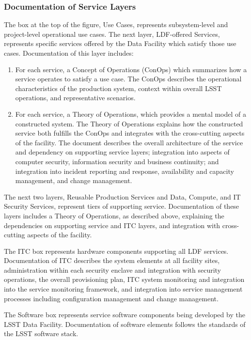 \subsubsection{Documentation of Service Layers}

The box at the top of the figure, Use Cases, represents subsystem-level and project-level operational use cases. The next layer, LDF-offered Services, represents specific services offered by the Data Facility which satisfy those use cases. Documentation of this layer includes:

\begin{enumerate}
\item	For each service, a Concept of Operations (ConOps) which summarizes how a service operates to satisfy a use case. The ConOps describes the operational characteristics of the production system, context within overall LSST operations, and representative scenarios. 
\item	For each service, a Theory of Operations, which provides a mental model of a constructed system. The Theory of Operations explains how the constructed service both fulfills the ConOps and integrates with the cross-cutting aspects of the facility. The document describes the overall architecture of the service and dependency on supporting service layers; integration into aspects of computer security, information security and business continuity; and integration into incident reporting and response, availability and capacity management, and change management.
\end{enumerate}

The next two layers, Reusable Production Services and Data, Compute, and IT Security Services, represent tiers of supporting service. Documentation of these layers includes a Theory of Operations, as described above, explaining the dependencies on supporting service and ITC layers, and integration with cross-cutting aspects of the facility.

The ITC box represents hardware components supporting all LDF services. Documentation of ITC describes the system elements at all facility sites, administration within each security enclave and integration with security operations, the overall provisioning plan, ITC system monitoring and integration into the service monitoring framework, and integration into service management processes including configuration management and change management.

The Software box represents service software components being developed by the LSST Data Facility. Documentation of software elements follows the standards of the LSST software stack.

